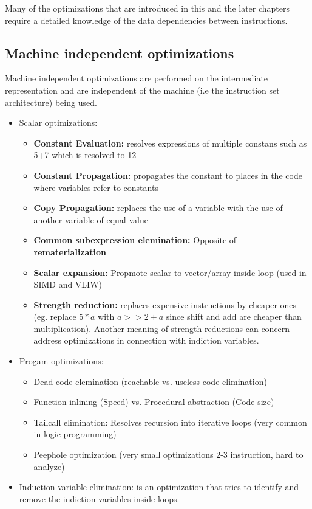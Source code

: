 \documentclass[a4paper,10pt]{article}
\begin{document}
Many of the optimizations that are introduced in this and the later chapters require a detailed knowledge of the data dependencies between
instructions.

\subsection{Machine independent optimizations}
Machine independent optimizations are performed on the intermediate representation and are independent of the machine (i.e the instruction
set architecture) being used.
\begin{itemize}
 \item Scalar optimizations:
 \begin{itemize}
     \item \textbf{Constant Evaluation:} resolves expressions of multiple constans such as 5+7 which is resolved to 12
     \item \textbf{Constant Propagation:} propagates the constant to places in the code where variables refer to constants
     \item \textbf{Copy Propagation:} replaces the use of a variable with the use of another variable of equal value
     \item \textbf{Common subexpression elemination:} Opposite of \textbf{rematerialization}
     \item \textbf{Scalar expansion:} Propmote scalar to vector/array inside loop (used in SIMD and VLIW)
     \item \textbf{Strength reduction:} replaces expensive instructions by cheaper ones (eg. replace $5*a$ with $a>>2+a$ since shift and add are cheaper than multiplication). Another meaning of strength reductions can concern address optimizations in connection with indiction variables.
 \end{itemize}
 \item Progam optimizations:
 \begin{itemize}
     \item Dead code elemination (reachable vs. useless code elimination)
     \item Function inlining (Speed) vs. Procedural abstraction (Code size)
     \item Tailcall elimination: Resolves recursion into iterative loops (very common in logic programming)
     \item Peephole optimization (very small optimizations 2-3 instruction, hard to analyze)
 \end{itemize}
 \item Induction variable elimination: is an optimization that tries to identify and remove the indiction variables inside loops.

\end{itemize}
\end{document}
